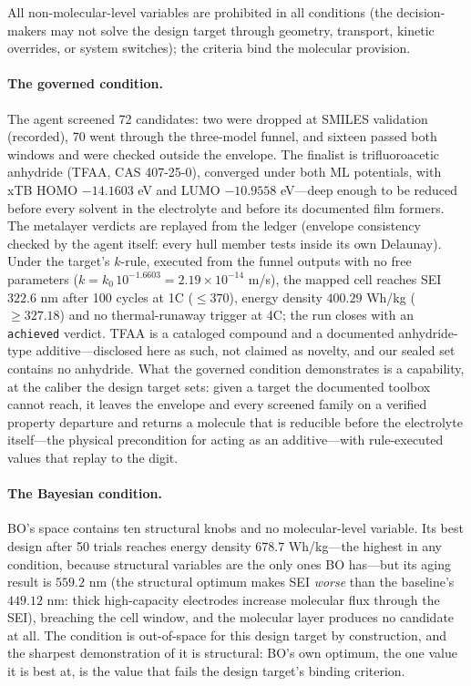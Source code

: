 All non-molecular-level variables are prohibited in all conditions (the
decision-makers may not solve the design target through geometry, transport,
kinetic overrides, or system switches); the criteria bind the molecular
provision.

\paragraph{The governed condition.} The agent screened 72 candidates: two
were dropped at SMILES validation (recorded), 70 went through the
three-model funnel, and sixteen passed both windows and were checked
outside the envelope. The finalist is trifluoroacetic anhydride (TFAA,
CAS 407-25-0), converged under both ML potentials, with xTB HOMO $-14.1603$ eV and
LUMO $-10.9558$ eV---deep enough to be reduced before every solvent in the
electrolyte and before its documented film formers. The metalayer verdicts
are replayed from the ledger (envelope consistency checked by the agent
itself: every hull member tests inside its own Delaunay). Under the
target's $k$-rule, executed from the funnel outputs with no free
parameters ($k = k_0\,10^{-1.6603} = 2.19\times10^{-14}$ m/s), the mapped
cell reaches SEI $322.6$ nm after 100 cycles at 1C ($\leq 370$), energy
density $400.29$ Wh/kg ($\geq 327.18$) and no thermal-runaway trigger at
4C; the run closes with an \texttt{achieved} verdict. TFAA is a cataloged
compound and a documented anhydride-type additive---disclosed here as
such, not claimed as novelty, and our sealed set contains no anhydride.
What the governed condition demonstrates is a capability, at the caliber
the design target sets: given a target the documented toolbox cannot reach, it
leaves the envelope and every screened family on a verified property
departure and returns a molecule that is reducible before the electrolyte
itself---the physical precondition for acting as an additive---with
rule-executed values that replay to the digit.

\paragraph{The Bayesian condition.} BO's space contains ten structural
knobs and no molecular-level variable. Its best design after 50 trials reaches
energy density $678.7$ Wh/kg---the highest in any condition, because
structural variables are the only ones BO has---but its aging result is
$559.2$ nm (the structural optimum makes SEI \emph{worse} than the
baseline's $449.12$ nm: thick high-capacity electrodes increase
molecular flux through the SEI), breaching the cell window, and the
molecular layer produces no candidate at all. The condition is
out-of-space for this design target by construction, and the sharpest
demonstration of it is structural: BO's own optimum, the one value it
is best at, is the value that fails the design target's binding criterion.

